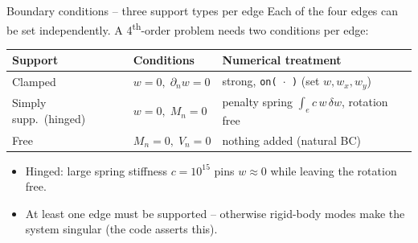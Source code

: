 \documentclass[10pt,c,intlimits,aspectratio=1610]{beamer}
\newcommand{\highlight}[1]{{\color{dpRed}#1}}
\begin{document}
\begin{frame}{Boundary conditions -- three support types per edge}
  Each of the four edges can be set independently. A 4\textsuperscript{th}-order
  problem needs \highlight{two} conditions per edge:
  \medskip
  \begin{center}
  \renewcommand{\arraystretch}{1.35}
  \begin{tabular}{@{}lll@{}}
    \toprule
    \textbf{Support} & \textbf{Conditions} & \textbf{Numerical treatment}\\
    \midrule
    Clamped          & $w=0,\;\partial_n w=0$ & strong, \texttt{on(\,$\cdot$\,)} (set $w,w_x,w_y$)\\
    Simply supp.\ (hinged) & $w=0,\;M_n=0$ & penalty spring $\int_e c\,w\,\delta w$, \;rotation free\\
    Free             & $M_n=0,\;V_n=0$ & nothing added (\highlight{natural} BC)\\
    \bottomrule
  \end{tabular}
  \end{center}
  \vspace{2mm}
  \begin{itemize}
    \item Hinged: large spring stiffness $c=10^{15}$ pins $w\!\approx\!0$ while
          leaving the rotation free.
    \item \highlight{At least one edge must be supported} -- otherwise rigid-body
          modes make the system singular (the code asserts this).
  \end{itemize}
\end{frame}
\end{document}
